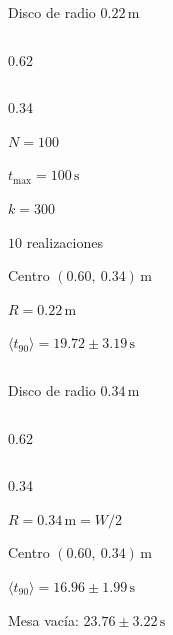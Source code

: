 \documentclass[aspectratio=169,10pt]{beamer}
\begin{document}
\begin{frame}{Disco de radio $0.22\,\mathrm{m}$}
  \begin{cols}
    \begin{column}{0.62\textwidth}
    \end{column}
    \begin{column}{0.34\textwidth}
      \begin{parametros}
        \item $N = 100$
        \item $t_{\max} = 100\,\mathrm{s}$
        \item $k = 300$
        \item $10$ realizaciones
        \item Centro $(0.60,\ 0.34)\,\mathrm{m}$
        \item $R = 0.22\,\mathrm{m}$
      \end{parametros}
      \begin{resultado}
        \item $\langle t_{90}\rangle = 19.72 \pm 3.19\,\mathrm{s}$
      \end{resultado}
    \end{column}
  \end{cols}
\end{frame}

\begin{frame}{Disco de radio $0.34\,\mathrm{m}$}
  \begin{cols}
    \begin{column}{0.62\textwidth}
    \end{column}
    \begin{column}{0.34\textwidth}
      \begin{parametros}
        \item $R = 0.34\,\mathrm{m} = W/2$
        \item Centro $(0.60,\ 0.34)\,\mathrm{m}$
      \end{parametros}
      \begin{resultado}
        \item $\langle t_{90}\rangle = 16.96 \pm 1.99\,\mathrm{s}$
        \item Mesa vacía: $23.76 \pm 3.22\,\mathrm{s}$
      \end{resultado}
    \end{column}
  \end{cols}
\end{frame}
\end{document}
